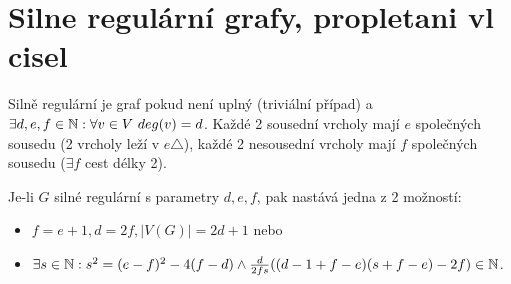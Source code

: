 \section{\texorpdfstring{Silne regulární grafy, propletani vl cisel}{Silne regulární grafy, propletani vl cisel}}
\vspace{5mm}
\large

\begin{definition}
	Silně regulární je graf pokud není uplný (triviální případ) a $\exists d,e,f \in \operatorname{\mathbb{N}}: \forall v \in V \ deg(v) = d$.
	Každé 2 sousední vrcholy mají $e$ společných sousedu (2 vrcholy leží v $e \triangle$), každé 2 nesousední vrcholy mají $f$ společných sousedu ($\exists f$ cest délky 2).
\end{definition}

\begin{theorem}
	Je-li $G$ silné regulární s parametry $d,e,f$, pak nastává jedna z 2 možností:
	\begin{itemize}
		\item $f = e + 1, d = 2f, |V(G)| = 2d + 1$ nebo
		\item $\exists s \in \operatorname{\mathbb{N}}: s^2 = (e - f)^2 - 4(f - d) \land \frac{d}{2fs}((d - 1 + f - e)(s + f - e) - 2f) \in \operatorname{\mathbb{N}}$.
	\end{itemize}
\end{theorem}
